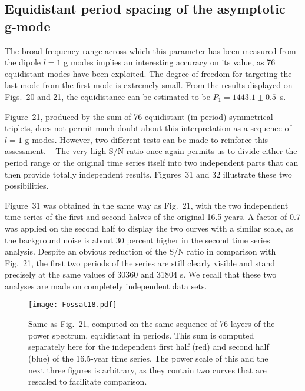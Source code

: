 \documentclass[bibyear]{aa}
\begin{document}
\subsection{Equidistant period spacing of the asymptotic g-mode}

The broad frequency range across which this parameter has been measured from the dipole $l=1$ g modes implies an interesting accuracy on its value, as 76 equidistant modes have been exploited. The degree of freedom  for  targeting  the last mode from the first mode is extremely small. From the results displayed on Figs.~20 and 21, the equidistance can be estimated to be  $P_{1}=1443.1\pm 0.5$~s. 


Figure~21, produced by the sum of 76 equidistant (in period) symmetrical triplets, does not permit much doubt about this interpretation as a sequence of $l=1$ g modes. However, two different tests can be made to reinforce this assessment. \
The very high S/N ratio once again permits us to divide either the period range or the original time series itself into two independent parts that can then provide totally independent results.
Figures~31 and 32 illustrate these two possibilities. 

Figure~31 was obtained in the same way as Fig.~21, with the two independent time series of the first and second halves of the original 16.5 years. A factor of 0.7 was applied on the second half to display the two curves with a similar scale, as the background noise is about 30 percent higher in the second time series analysis. Despite an obvious reduction of the S/N ratio in comparison with Fig.~21, the first two periods of the series are still clearly visible and stand precisely at the same values of 30360 and 31804 s. We recall that these two analyses are made on completely independent data sets. 

\begin{figure}
\centering
\texttt{[image: Fossat18.pdf]}
\caption{Same as Fig.~21, computed on the same sequence of 76 layers of the power spectrum, equidistant in periods. This sum is computed separately here for the independent first half (red) and second half (blue) of the 16.5-year time series. The power scale of this and the next three figures is arbitrary, as they contain two curves that are rescaled to facilitate comparison.}
\label{fig:max_row_C1_8y_8y}
\end{figure} 
\end{document}
